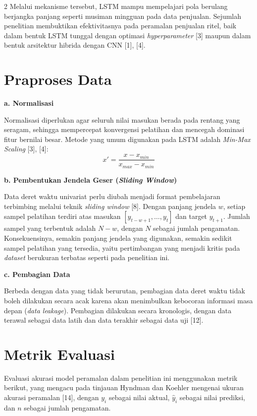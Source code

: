 \documentclass[12pt, a4paper, onecolumn, oneside]{report}
\begin{document}
\begin{spacing}{2}
Melalui mekanisme tersebut, LSTM mampu mempelajari pola berulang berjangka panjang seperti musiman mingguan pada data penjualan. Sejumlah penelitian membuktikan efektivitasnya pada peramalan penjualan ritel, baik dalam bentuk LSTM tunggal dengan optimasi \textit{hyperparameter} [3] maupun dalam bentuk arsitektur hibrida dengan CNN [1], [4].

\section{Praproses Data}

\noindent\textbf{a. Normalisasi}

Normalisasi diperlukan agar seluruh nilai masukan berada pada rentang yang seragam, sehingga mempercepat konvergensi pelatihan dan mencegah dominasi fitur bernilai besar. Metode yang umum digunakan pada LSTM adalah \textit{Min-Max Scaling} [3], [4]:
\begin{equation}
    x' = \frac{x - x_{min}}{x_{max} - x_{min}}
\end{equation}

\noindent\textbf{b. Pembentukan Jendela Geser (\textit{Sliding Window})}

Data deret waktu univariat perlu diubah menjadi format pembelajaran terbimbing melalui teknik \textit{sliding window} [8]. Dengan panjang jendela $w$, setiap sampel pelatihan terdiri atas masukan $[y_{t-w+1}, \dots, y_t]$ dan target $y_{t+1}$. Jumlah sampel yang terbentuk adalah $N - w$, dengan $N$ sebagai jumlah pengamatan. Konsekuensinya, semakin panjang jendela yang digunakan, semakin sedikit sampel pelatihan yang tersedia, yaitu pertimbangan yang menjadi kritis pada \textit{dataset} berukuran terbatas seperti pada penelitian ini.

\noindent\textbf{c. Pembagian Data}

Berbeda dengan data yang tidak berurutan, pembagian data deret waktu tidak boleh dilakukan secara acak karena akan menimbulkan kebocoran informasi masa depan (\textit{data leakage}). Pembagian dilakukan secara kronologis, dengan data terawal sebagai data latih dan data terakhir sebagai data uji [12].

\section{Metrik Evaluasi}

Evaluasi akurasi model peramalan dalam penelitian ini menggunakan metrik berikut, yang mengacu pada tinjauan Hyndman dan Koehler mengenai ukuran akurasi peramalan [14], dengan $y_i$ sebagai nilai aktual, $\hat{y}_i$ sebagai nilai prediksi, dan $n$ sebagai jumlah pengamatan.


\end{spacing}
\end{document}
